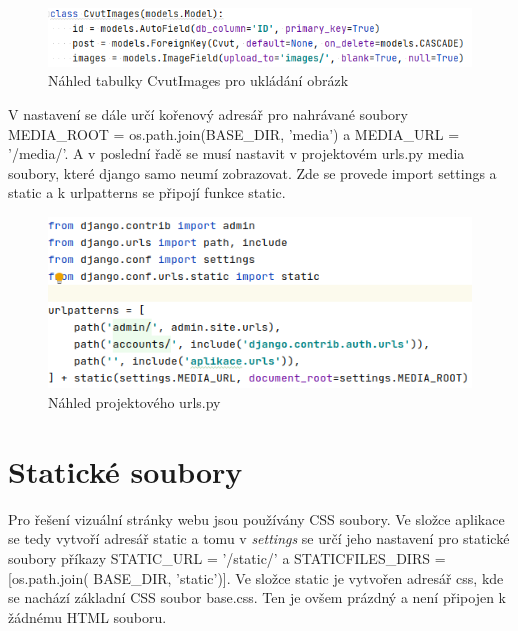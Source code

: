 \begin{figure}[H] \centering
    \includegraphics[width=430pt]{./pictures/9-db-cvutimages.PNG}
    \caption[Náhled tabulky CvutImages pro ukládání obrázků]{Náhled tabulky CvutImages pro ukládání obrázk}
	\label{fig:Náhled tabulky CvutImages pro ukládání obrázk}              
\end{figure}


V nastavení se dále určí kořenový adresář pro nahrávané soubory
MEDIA\_ROOT = os.path.join(BASE\_DIR, 'media') a
MEDIA\_URL = '/media/'.  A v poslední řadě se musí nastavit v
projektovém urls.py media soubory, které django samo neumí
zobrazovat. Zde se provede import settings a static a k urlpatterns se
připojí funkce static.

\begin{figure}[H] \centering
    \includegraphics[width=380pt]{./pictures/10-media-urlspy.PNG}
    \caption[Náhled projektového urls.py]{Náhled projektového urls.py}
	\label{fig:Náhled projektového urls.py}              
\end{figure}

\newpage

\section{Statické soubory}

Pro řešení vizuální stránky webu jsou používány CSS soubory. Ve složce
aplikace se tedy vytvoří adresář static a tomu v \emph{settings} se
určí jeho nastavení pro statické soubory příkazy STATIC\_URL =
  '/static/' a STATICFILES\_DIRS = [os.path.join( BASE\_DIR,
    'static')]. Ve složce static je vytvořen adresář css, kde se
nachází základní CSS soubor base.css. Ten je ovšem prázdný a není
připojen k žádnému HTML souboru.

